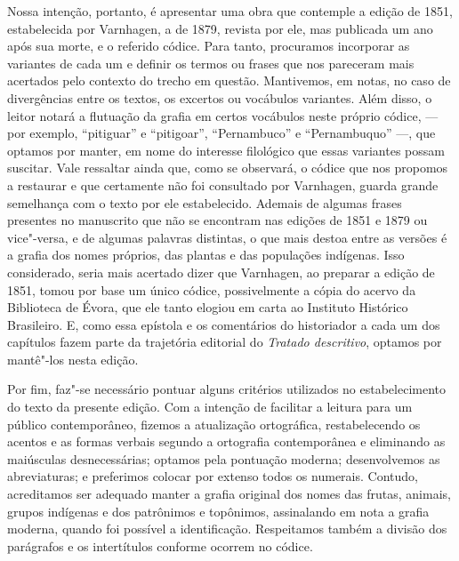 Nossa intenção, portanto, é apresentar uma obra que contemple a edição
de 1851, estabelecida por Varnhagen, a de 1879, revista por ele, mas publicada um ano após sua
morte, e o referido códice. Para tanto, procuramos incorporar as
variantes de cada um e definir os termos ou frases que nos pareceram
mais acertados pelo contexto do trecho em questão. Mantivemos, em
notas, no caso de divergências entre os textos, os excertos ou
vocábulos variantes. Além disso, o leitor notará a flutuação da grafia 
em certos vocábulos neste próprio códice, --- por exemplo, ``pitiguar'' e ``pitigoar'', 
``Pernambuco'' e ``Pernambuquo'' ---, que optamos por manter, em nome do interesse 
filológico que essas variantes possam suscitar.
 Vale ressaltar ainda que, como se observará, o
códice que nos propomos a restaurar e que certamente não foi consultado
por Varnhagen, guarda grande semelhança com o texto por ele
estabelecido. Ademais de algumas frases presentes no manuscrito que não
se encontram nas edições de 1851 e 1879 ou vice"-versa, e de algumas
palavras distintas, o que mais destoa entre as versões é a grafia dos
nomes próprios, das plantas e das populações indígenas. Isso
considerado, seria mais acertado dizer que Varnhagen, ao preparar a
edição de 1851, tomou por base um único códice, possivelmente a cópia
do acervo da Biblioteca de Évora, que ele tanto elogiou em carta ao
Instituto Histórico Brasileiro. E, como essa epístola e os comentários
do historiador a cada um dos capítulos fazem parte da trajetória
editorial do \textit{Tratado descritivo}, optamos por mantê"-los nesta edição. 

Por fim, faz"-se necessário pontuar alguns critérios utilizados no
estabelecimento do texto da presente edição. Com a intenção de
facilitar a leitura para um público contemporâneo, fizemos a
atualização ortográfica, restabelecendo os acentos e as formas verbais
segundo a ortografia contemporânea e eliminando as maiúsculas
desnecessárias; optamos pela pontuação moderna; desenvolvemos as
abreviaturas; e preferimos colocar por extenso todos os numerais.
Contudo, acreditamos ser adequado manter a grafia original dos nomes
das frutas, animais, grupos indígenas e dos patrônimos e topônimos,
assinalando em nota a grafia moderna, quando foi possível a
identificação. Respeitamos também a divisão dos parágrafos e os
intertítulos conforme ocorrem no códice.  

